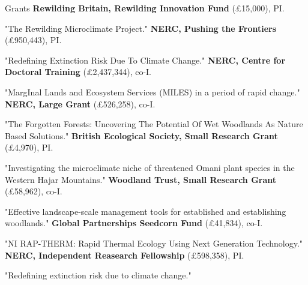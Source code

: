 \begin{rubric}{Grants}
\entry*[2024] \textbf{Rewilding Britain, Rewilding Innovation Fund} (£15,000), PI.
	\par \footnotesize "The Rewilding Microclimate Project." \normalsize
\entry*[2023] \textbf{NERC, Pushing the Frontiers} (£950,443), PI.
	\par \footnotesize "Redefining Extinction Risk Due To Climate Change." \normalsize
\entry*[2023] \textbf{NERC, Centre for Doctoral Training} (£2,437,344), co-I.
	\par \footnotesize "MargInal Lands and Ecosystem Services (MILES) in a period of rapid change." \normalsize
\entry*[2023] \textbf{NERC, Large Grant} (£526,258), co-I.
	\par \footnotesize "The Forgotten Forests: Uncovering The Potential Of Wet Woodlands As Nature Based Solutions." \normalsize
\entry*[2022] \textbf{British Ecological Society, Small Research Grant} (£4,970), PI.
	\par \footnotesize "Investigating the microclimate niche of threatened Omani plant species in the Western Hajar Mountains." \normalsize
\entry*[2022] \textbf{Woodland Trust, Small Research Grant} (£58,962), co-I.
	\par \footnotesize "Effective landscape-scale management tools for established and establishing woodlands." \normalsize
\entry*[2022] \textbf{Global Partnerships Seedcorn Fund} (£41,834), co-I.
	\par \footnotesize "NI RAP-THERM: Rapid Thermal Ecology Using Next Generation Technology." \normalsize
\entry*[2020] \textbf{NERC, Independent Reasearch Fellowship} (£598,358), PI.
	\par \footnotesize "Redefining extinction risk due to climate change." \normalsize
\end{rubric}